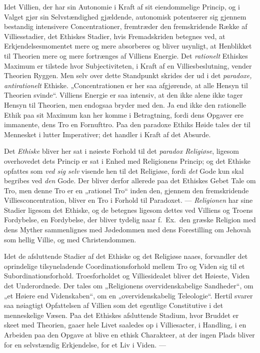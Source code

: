 \documentclass[12pt,a4paper]{book}
\newcommand{\opage}[1]{\marginnote{\footnotesize\textit{[#1]}}}
\begin{document}
Idet Villien, der har sin Autonomie i Kraft af sit eiendommelige
Princip, og i Valget gjør sin Selvstændighed gjældende, autonomisk
potentserer sig gjennem bestandig intensivere Concentrationer,
fremtræder den fremskridende Række af Villiesstadier, det Ethiskes
Stadier, hvis Fremadskriden betegnes ved, at Erkjendelsesmomentet mere
og mere absorberes og bliver usynligt, at Henblikket til Theorien mere
\opage{129}og mere fortrænges af Villiens Energie. Det \emph{rationelt} Ethiskes Maximum
er tilstede hvor Subjectiviteten, i Kraft af en Villiesbeslutning,
vender Theorien Ryggen. Men selv over dette Standpunkt skrides der ud
i det \emph{paradoxe, antirationelt} Ethiske. „Concentrationen er her saa
afgjørende, at alle Hensyn til Theorien svinde“. Villiens Energie er
saa intensiv, at den ikke alene ikke tager Hensyn til Theorien, men
endogsaa bryder med den. Ja end ikke den rationelle Ethik paa sit
Maximum kan her komme i Betragtning, fordi dens Opgaver ere immanente,
dens Tro en Fornufttro. Paa den paradoxe Ethiks Høide tales der til
Mennesket i lutter Imperativer; det handler i Kraft af det Absurde.

Det \emph{Ethiske} bliver her sat i nøieste Forhold til det \emph{paradox
Religiøse}, ligesom overhovedet dets Princip er sat i Enhed med
Religionens Princip; og det Ethiske opfattes som \emph{ved sig selv} visende
hen til det Religiøse, fordi \emph{det} Gode kun skal begribes ved \emph{den} Gode.
Der bliver derfor allerede paa det Ethiskes Gebet Tale om Tro, men
denne Tro er en „rationel Tro“ inden den, gjennem den fremskridende
Villiesconcentration, bliver en Tro i Forhold til Paradoxet. --- \emph{Religionen} har sine Stadier ligesom det Ethiske, og de betegnes ligesom dettes ved
Villiens og Troens Fordybelse, en Fordybelse, der bliver tydelig naar
f.~Ex.\ den græske Religion med dens Myther sammenlignes med Jødedommen
med dens Forestilling om Jehovah som hellig Villie, og med
Christendommen.

Idet de afsluttende Stadier af det Ethiske og det Religiøse naaes,
forvandler det oprindelige tilsyneladende Coordinationsforhold mellem
Tro og Viden sig til et Subordinationsforhold. Troesforholdet og
Villiesidealet bliver det Høieste, Viden det Underordnede. Der tales
om „Religionens overvidenskabelige Sandheder“, om „et Høiere end
Videnskaben“, om en „overvidenskabelig Teleologie“. Hertil svarer
saa nøiagtigt Opfattelsen af Villien som det egentlige Constitutive i
det menneskelige Væsen. Paa det Ethiskes afsluttende Stadium, hvor
Bruddet er skeet med Theorien, \opage{130}gaaer hele Livet saaledes op i
Villiesacter, i Handling, i en Arbeiden paa den Opgave at blive en
ethisk Charakteer, at der ingen Plads bliver for en selvstændig
Erkjendelse, for et Liv i Viden. ---
\end{document}
